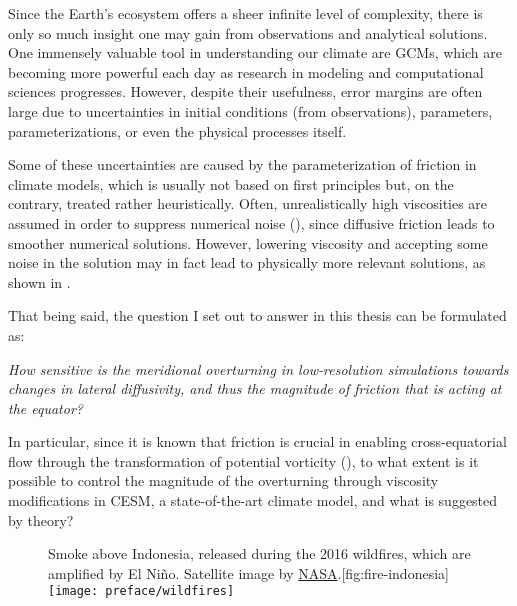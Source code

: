 Since the Earth's ecosystem offers a sheer infinite level of complexity, there is only so much insight one may gain from observations and analytical solutions. One immensely valuable tool in understanding our climate are \acp{GCM}, which are becoming more powerful each day as research in modeling and computational sciences progresses. However, despite their usefulness, error margins are often large due to uncertainties in initial conditions (from observations), parameters, parameterizations, or even the physical processes itself. 

Some of these uncertainties are caused by the parameterization of friction in climate models, which is usually not based on first principles but, on the contrary, treated rather heuristically. Often, unrealistically high viscosities are assumed in order to suppress numerical noise (), since diffusive friction leads to smoother numerical solutions. However, lowering viscosity and accepting some noise in the solution may in fact lead to physically more relevant solutions, as shown in \eg \cite{jochum}.

That being said, the question I set out to answer in this thesis can be formulated as:

{\slshape
How sensitive is the meridional overturning in low-resolution simulations towards changes in lateral diffusivity, and thus the magnitude of friction that is acting at the equator?
}

In particular, since it is known that friction is crucial in enabling cross-equatorial flow through the transformation of potential vorticity (), to what extent is it possible to control the magnitude of the overturning through viscosity modifications in \ac{CESM}, a state-of-the-art climate model, and what is suggested by theory?

\begin{figure}[b!]
	\begin{sidecaption}{Smoke above Indonesia, released during the 2016 wildfires, which are amplified by El Ni\~{n}o. Satellite image by \href{http://http://www.nasa.gov/feature/goddard/2016/el-nino-brought-drought-and-fire-to-indonesia}{NASA}.}[fig:fire-indonesia]
		\antimpjustification
		\texttt{[image: preface/wildfires]}
	\end{sidecaption}
\end{figure}
